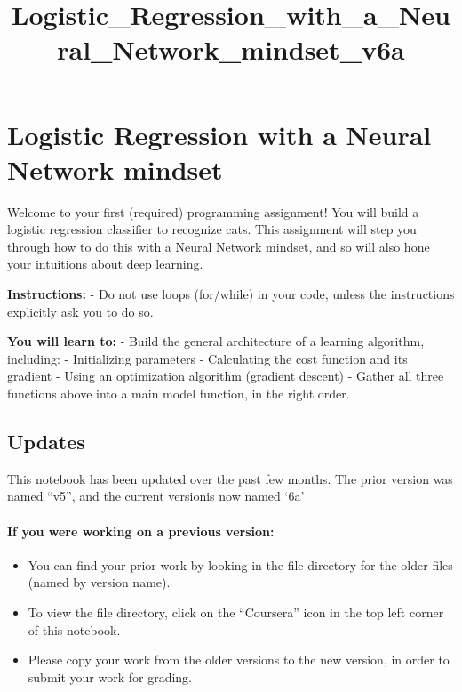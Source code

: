 \documentclass[11pt]{article}
\title{Logistic\_Regression\_with\_a\_Neural\_Network\_mindset\_v6a}
\begin{document}
    
    
    \maketitle
    
    

    
    \section{Logistic Regression with a Neural Network
mindset}\label{logistic-regression-with-a-neural-network-mindset}

Welcome to your first (required) programming assignment! You will build
a logistic regression classifier to recognize cats. This assignment will
step you through how to do this with a Neural Network mindset, and so
will also hone your intuitions about deep learning.

\textbf{Instructions:} - Do not use loops (for/while) in your code,
unless the instructions explicitly ask you to do so.

\textbf{You will learn to:} - Build the general architecture of a
learning algorithm, including: - Initializing parameters - Calculating
the cost function and its gradient - Using an optimization algorithm
(gradient descent) - Gather all three functions above into a main model
function, in the right order.

    \subsection{Updates}\label{updates}

This notebook has been updated over the past few months. The prior
version was named ``v5'', and the current versionis now named `6a'

\paragraph{If you were working on a previous
version:}\label{if-you-were-working-on-a-previous-version}

\begin{itemize}
\itemsep1pt\parskip0pt
\item
  You can find your prior work by looking in the file directory for the
  older files (named by version name).
\item
  To view the file directory, click on the ``Coursera'' icon in the top
  left corner of this notebook.
\item
  Please copy your work from the older versions to the new version, in
  order to submit your work for grading.
\end{itemize}
\end{document}
